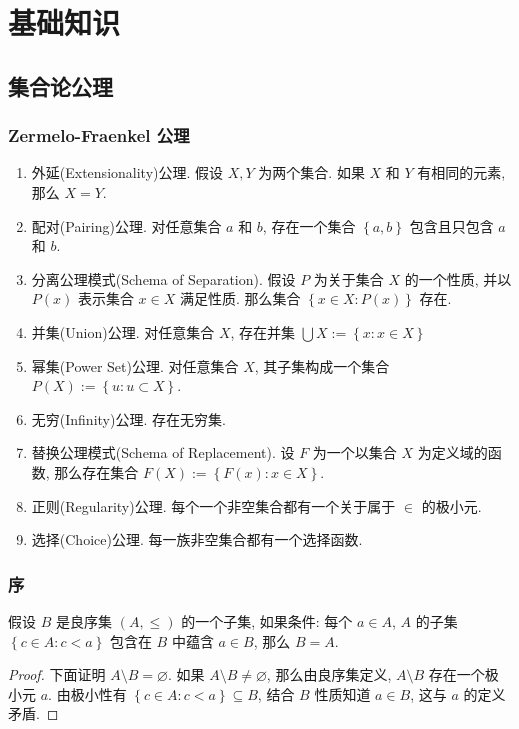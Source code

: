 \chapter{基础知识}

\section{集合论公理}

\subsection{Zermelo-Fraenkel 公理}

\begin{enumerate}
  \item 外延(Extensionality)公理.
    假设 \( X, Y \) 为两个集合.
    如果 \( X \) 和 \( Y \) 有相同的元素, 那么 \( X = Y \).
  \item 配对(Pairing)公理.
    对任意集合 \( a \) 和 \( b \), 存在一个集合 \( \left\lbrace a, b
    \right\rbrace \) 包含且只包含 \( a \) 和 \( b \).
  \item 分离公理模式(Schema of Separation).
    假设 \( P \) 为关于集合 \( X \) 的一个性质, 并以 \( P(x) \) 表示集合 \( x
    \in X \) 满足性质.
    那么集合 \( \left\lbrace x \in X: P(x) \right\rbrace \) 存在.
  \item 并集(Union)公理.
    对任意集合 \( X \), 存在并集 \( \bigcup X := \left\lbrace x: x \in X \right\rbrace \)
  \item 幂集(Power Set)公理.
    对任意集合 \( X \), 其子集构成一个集合 \( P(X) := \left\lbrace u: u \subset
    X\right\rbrace \).
  \item 无穷(Infinity)公理.
    存在无穷集.
  \item 替换公理模式(Schema of Replacement).
    设 \( F \) 为一个以集合 \( X \) 为定义域的函数, 那么存在集合 \( F(X) :=
    \left\lbrace F(x) : x \in X \right\rbrace \).
  \item 正则(Regularity)公理.
    每个一个非空集合都有一个关于属于 \( \in \) 的极小元.
  \item 选择(Choice)公理.
    每一族非空集合都有一个选择函数.
\end{enumerate}

\subsection{序}

\begin{theorem}[超限归纳法]
  假设 \( B \) 是良序集 \( (A, \leq) \) 的一个子集, 如果条件: 每个 \( a \in A \),
  \( A \) 的子集 \( \left\lbrace c \in A: c < a \right\rbrace \) 包含在 \(
  B\) 中蕴含 \( a \in B \), 那么 \( B = A \).
\end{theorem}
\begin{proof}
  下面证明 \( A \setminus B = \varnothing \).
  如果 \( A \setminus B \neq \varnothing \), 那么由良序集定义, \( A \setminus B
  \) 存在一个极小元 \( a \).
  由极小性有 \( \left\lbrace c \in A: c < a \right\rbrace \subseteq B \), 结合
  \( B \) 性质知道 \( a \in B \), 这与 \( a \) 的定义矛盾.
\end{proof}
